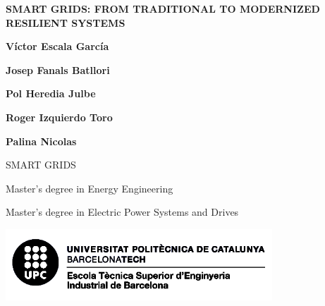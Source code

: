\documentclass[10pt, a4paper]{report}
\begin{document}
\begin{titlepage}
   \begin{center}
      \vspace*{2em}
      {\Large \bfseries SMART GRIDS: FROM TRADITIONAL TO MODERNIZED RESILIENT SYSTEMS}

       \vspace{6em}

       \textbf{Víctor Escala García}

       \textbf{Josep Fanals Batllori}

       \textbf{Pol Heredia Julbe}

       \textbf{Roger Izquierdo Toro}

       \textbf{Palina Nicolas}

       \vfill

       \vspace{1em}

       SMART GRIDS

       Master's degree in Energy Engineering

       Master's degree in Electric Power Systems and Drives

       \vspace{8em}
     
       \includegraphics[width=10cm]{Data/Logo.png}
            
   \end{center}
\end{titlepage}
\end{document}
